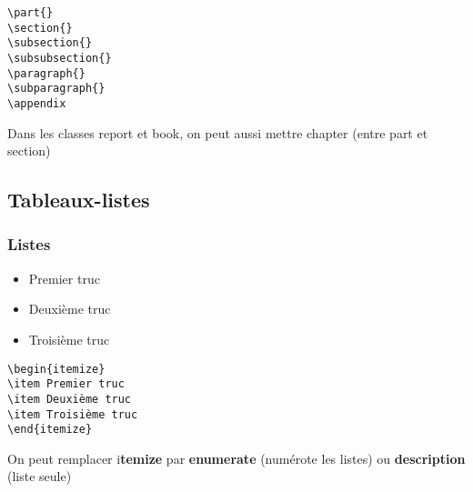 \documentclass[12pt,french,oneside]{report}
\begin{document}
\begin{spacing}{1.2}
\begin{verbatim}
\part{}
\section{}
\subsection{}
\subsubsection{}
\paragraph{}
\subparagraph{}
\appendix
\end{verbatim}

Dans les classes report et book, on peut aussi mettre chapter{} (entre part et section)

\subsection{Tableaux-listes}

\subsubsection{Listes}

\begin{center}
\begin{itemize}
\item Premier truc
\item Deuxième truc
\item Troisième truc
\end{itemize}
\end{center}

\begin{verbatim}
\begin{itemize}
\item Premier truc
\item Deuxième truc
\item Troisième truc
\end{itemize}
\end{verbatim}

On peut remplacer i\textbf{temize} par \textbf{enumerate} (numérote les listes) ou \textbf{description} (liste seule)


\end{spacing}
\end{document}
